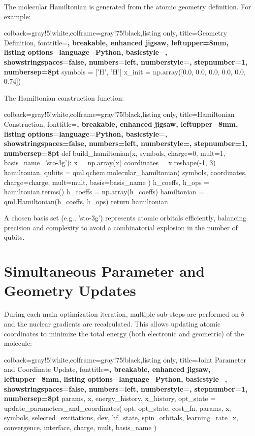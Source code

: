 The molecular Hamiltonian is generated from the atomic geometry definition. For example:

\begin{tcblisting}{colback=gray!5!white,colframe=gray!75!black,listing only,
  title=Geometry Definition, fonttitle=\bfseries, breakable, enhanced jigsaw, leftupper=8mm,
  listing options={language=Python, basicstyle=\ttfamily\small,
  showstringspaces=false, numbers=left, numberstyle=\footnotesize, stepnumber=1, numbersep=8pt}}
symbols = ['H', 'H']
x_init = np.array([0.0, 0.0, 0.0, 0.0, 0.0, 0.74]) 
\end{tcblisting}

The Hamiltonian construction function:

\begin{tcblisting}{colback=gray!5!white,colframe=gray!75!black,listing only,
  title=Hamiltonian Construction, fonttitle=\bfseries, breakable, enhanced jigsaw, leftupper=8mm,
  listing options={language=Python, basicstyle=\ttfamily\small,
  showstringspaces=false, numbers=left, numberstyle=\footnotesize, stepnumber=1, numbersep=8pt}}
def build_hamiltonian(x, symbols, charge=0, mult=1, basis_name='sto-3g'):
    x = np.array(x)
    coordinates = x.reshape(-1, 3)
    hamiltonian, qubits = qml.qchem.molecular_hamiltonian(
        symbols, coordinates, charge=charge, mult=mult, basis=basis_name
    )
    h_coeffs, h_ops = hamiltonian.terms()
    h_coeffs = np.array(h_coeffs)
    hamiltonian = qml.Hamiltonian(h_coeffs, h_ops)
    return hamiltonian
\end{tcblisting}

A chosen basis set (e.g., 'sto-3g') represents atomic orbitals efficiently, balancing precision and complexity to avoid a combinatorial explosion in the number of qubits.

\section{Simultaneous Parameter and Geometry Updates}

During each main optimization iteration, multiple sub-steps are performed on \(\theta\) and the nuclear gradients are recalculated. This allows updating atomic coordinates to minimize the total energy (both electronic and geometric) of the molecule:

\begin{tcblisting}{colback=gray!5!white,colframe=gray!75!black,listing only,
    title=Joint Parameter and Coordinate Update, fonttitle=\bfseries, breakable, enhanced jigsaw, leftupper=8mm,
    listing options={language=Python, basicstyle=\ttfamily\small,
    showstringspaces=false, numbers=left, numberstyle=\footnotesize, stepnumber=1, numbersep=8pt}}
params, x, energy_history, x_history, opt_state = update_parameters_and_coordinates(
    opt, opt_state, cost_fn, params, x, symbols, selected_excitations, dev, hf_state, spin_orbitals,
    learning_rate_x, convergence, interface, charge, mult, basis_name
)
\end{tcblisting}

